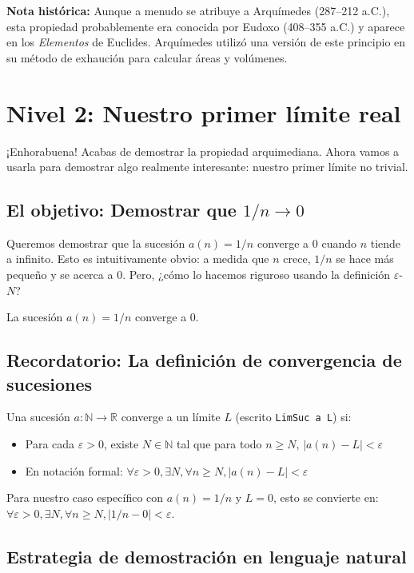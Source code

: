 \textbf{Nota histórica:} Aunque a menudo se atribuye a Arquímedes (287--212 a.C.), esta propiedad probablemente era conocida por Eudoxo (408--355 a.C.) y aparece en los \textit{Elementos} de Euclides. Arquímedes utilizó una versión de este principio en su método de exhaución para calcular áreas y volúmenes.

\section{Nivel 2: Nuestro primer límite real}

¡Enhorabuena! Acabas de demostrar la propiedad arquimediana. Ahora vamos a usarla para demostrar algo realmente interesante: nuestro primer límite no trivial.

\subsection{El objetivo: Demostrar que $1/n \to 0$}

Queremos demostrar que la sucesión $a(n) = 1/n$ converge a 0 cuando $n$ tiende a infinito. Esto es intuitivamente obvio: a medida que $n$ crece, $1/n$ se hace más pequeño y se acerca a 0. Pero, ¿cómo lo hacemos riguroso usando la definición $\varepsilon$-$N$?

\begin{theorem}
  La sucesión $a(n) = 1/n$ converge a 0.
\end{theorem}

\subsection{Recordatorio: La definición de convergencia de sucesiones}

Una sucesión $a : \mathbb{N} \to \mathbb{R}$ converge a un límite $L$ (escrito \texttt{LimSuc a L}) si:
\begin{itemize}
    \item Para cada $\varepsilon > 0$, existe $N \in \mathbb{N}$ tal que para todo $n \ge N$, $|a(n) - L| < \varepsilon$
    \item En notación formal: $\forall \varepsilon > 0, \exists N, \forall n \ge N, |a(n) - L| < \varepsilon$
\end{itemize}
Para nuestro caso específico con $a(n) = 1/n$ y $L = 0$, esto se convierte en:
$\forall \varepsilon > 0, \exists N, \forall n \ge N, |1/n - 0| < \varepsilon$.

\subsection{Estrategia de demostración en lenguaje natural}

